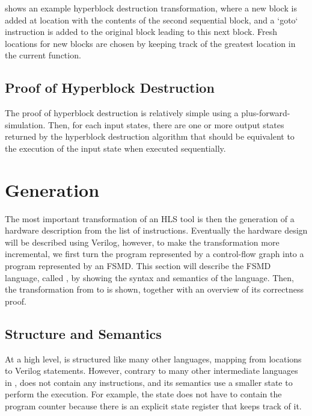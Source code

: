  shows an example hyperblock destruction
transformation, where a new block is added at location  with the
contents of the second sequential block, and a \rtlinline`goto` instruction is
added to the original block leading to this next block.  Fresh locations for new
blocks are chosen by keeping track of the greatest location in the current
function.

\subsection{Proof of Hyperblock Destruction}

The proof of hyperblock destruction is relatively simple using a
\gls{plus-forward-simulation}.  Then, for each input states, there are one or
more output states returned by the hyperblock destruction algorithm that should
be equivalent to the execution of the input state when executed sequentially.

\section{\htl{} Generation}%
\label{sec:hg:htl-generation}

The most important transformation of an HLS tool is then the generation of a
hardware description from the list of instructions.  Eventually the hardware
design will be described using Verilog, however, to make the transformation more
incremental, we first turn the program represented by a control-flow graph into
a program represented by an \gls{FSMD}.  This section will describe the
\gls{FSMD} language, called \htl{}, by showing the syntax and semantics of the
language.  Then, the transformation from \rtlsubpar{} to \htl{} is shown, together
with an overview of its correctness proof.

\subsection{\htl{} Structure and Semantics}%
\label{sec:hg:htl-structure-and-semantics}

At a high level, \htl{} is structured like many other \compcert{} languages,
mapping from locations to Verilog statements.  However, contrary to many other
intermediate languages in \compcert{}, \htl{} does not contain any instructions,
and its semantics use a smaller state to perform the execution.  For example,
the state does not have to contain the program counter because there is an
explicit state register that keeps track of it.

